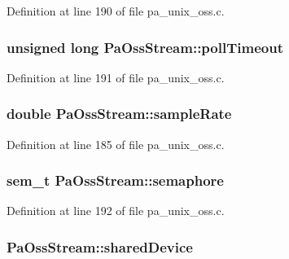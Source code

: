 Definition at line 190 of file pa\+\_\+unix\+\_\+oss.\+c.

\subsubsection[{\texorpdfstring{poll\+Timeout}{pollTimeout}}]{\setlength{\rightskip}{0pt plus 5cm}unsigned long Pa\+Oss\+Stream\+::poll\+Timeout}\hypertarget{struct_pa_oss_stream_a0640a35e51badac6cb590bf436749766}{}\label{struct_pa_oss_stream_a0640a35e51badac6cb590bf436749766}


Definition at line 191 of file pa\+\_\+unix\+\_\+oss.\+c.

\subsubsection[{\texorpdfstring{sample\+Rate}{sampleRate}}]{\setlength{\rightskip}{0pt plus 5cm}double Pa\+Oss\+Stream\+::sample\+Rate}\hypertarget{struct_pa_oss_stream_a43cf201ba8bace361a7c34ecf707c8cd}{}\label{struct_pa_oss_stream_a43cf201ba8bace361a7c34ecf707c8cd}


Definition at line 185 of file pa\+\_\+unix\+\_\+oss.\+c.

\subsubsection[{\texorpdfstring{semaphore}{semaphore}}]{\setlength{\rightskip}{0pt plus 5cm}sem\+\_\+t Pa\+Oss\+Stream\+::semaphore}\hypertarget{struct_pa_oss_stream_ae7d78176c917f2ca1ee2fc9a55ef833e}{}\label{struct_pa_oss_stream_ae7d78176c917f2ca1ee2fc9a55ef833e}


Definition at line 192 of file pa\+\_\+unix\+\_\+oss.\+c.

\subsubsection[{\texorpdfstring{shared\+Device}{sharedDevice}}]{ Pa\+Oss\+Stream\+::shared\+Device}\hypertarget{struct_pa_oss_stream_a07e910fb0e37c6edd896bb26652f2731}{}\label{struct_pa_oss_stream_a07e910fb0e37c6edd896bb26652f2731}


